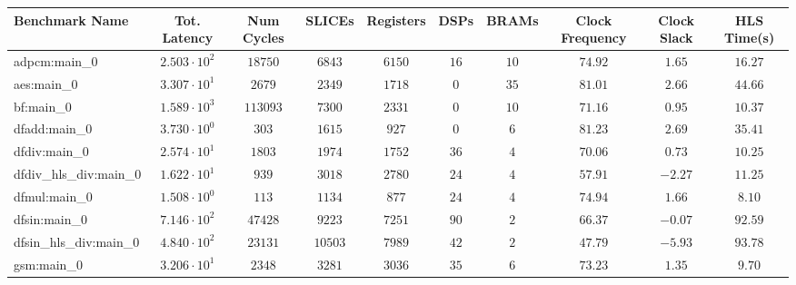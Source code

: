 \begin{tabular}{|l|c|c|c|c|c|c|c|c|c|}
\hline
Benchmark Name          & Tot. Latency           & Num Cycles & SLICEs    & Registers & DSPs    & BRAMs   & Clock Frequency & Clock Slack & HLS Time(s) \\
\hline
adpcm:main\_0           & $ 2.503 \cdot 10^{2} $ & $ 18750  $ & $ 6843  $ & $ 6150  $ & $ 16  $ & $ 10  $ & $ 74.92       $ & $ 1.65    $ & $ 16.27   $ \\
aes:main\_0             & $ 3.307 \cdot 10^{1} $ & $ 2679   $ & $ 2349  $ & $ 1718  $ & $ 0   $ & $ 35  $ & $ 81.01       $ & $ 2.66    $ & $ 44.66   $ \\
bf:main\_0              & $ 1.589 \cdot 10^{3} $ & $ 113093 $ & $ 7300  $ & $ 2331  $ & $ 0   $ & $ 10  $ & $ 71.16       $ & $ 0.95    $ & $ 10.37   $ \\
dfadd:main\_0           & $ 3.730 \cdot 10^{0} $ & $ 303    $ & $ 1615  $ & $ 927   $ & $ 0   $ & $ 6   $ & $ 81.23       $ & $ 2.69    $ & $ 35.41   $ \\
dfdiv:main\_0           & $ 2.574 \cdot 10^{1} $ & $ 1803   $ & $ 1974  $ & $ 1752  $ & $ 36  $ & $ 4   $ & $ 70.06       $ & $ 0.73    $ & $ 10.25   $ \\
dfdiv\_hls\_div:main\_0 & $ 1.622 \cdot 10^{1} $ & $ 939    $ & $ 3018  $ & $ 2780  $ & $ 24  $ & $ 4   $ & $ 57.91       $ & $ -2.27   $ & $ 11.25   $ \\
dfmul:main\_0           & $ 1.508 \cdot 10^{0} $ & $ 113    $ & $ 1134  $ & $ 877   $ & $ 24  $ & $ 4   $ & $ 74.94       $ & $ 1.66    $ & $ 8.10    $ \\
dfsin:main\_0           & $ 7.146 \cdot 10^{2} $ & $ 47428  $ & $ 9223  $ & $ 7251  $ & $ 90  $ & $ 2   $ & $ 66.37       $ & $ -0.07   $ & $ 92.59   $ \\
dfsin\_hls\_div:main\_0 & $ 4.840 \cdot 10^{2} $ & $ 23131  $ & $ 10503 $ & $ 7989  $ & $ 42  $ & $ 2   $ & $ 47.79       $ & $ -5.93   $ & $ 93.78   $ \\
gsm:main\_0             & $ 3.206 \cdot 10^{1} $ & $ 2348   $ & $ 3281  $ & $ 3036  $ & $ 35  $ & $ 6   $ & $ 73.23       $ & $ 1.35    $ & $ 9.70    $ \\

\end{tabular}
